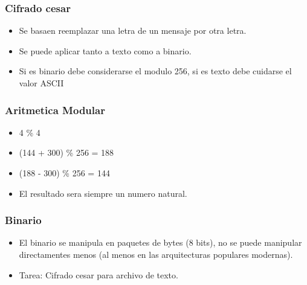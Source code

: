 \documentclass[11pt]{article}
\begin{document}
\subsubsection{Cifrado cesar}
\label{sec:org1281b5b}
\begin{itemize}
\item Se basaen reemplazar una letra de un mensaje por otra letra.
\item Se puede aplicar tanto a texto como a binario.
\item Si es binario debe considerarse el modulo 256, si es texto debe cuidarse el valor ASCII
\end{itemize}
\subsubsection{Aritmetica Modular}
\label{sec:org6bbca28}
\begin{itemize}
\item 4 \% 4
\item (144 + 300) \% 256 = 188
\item (188 - 300) \% 256 = 144
\item El resultado sera siempre un numero natural.
\end{itemize}
\subsubsection{Binario}
\label{sec:org7a69e42}
\begin{itemize}
\item El binario se manipula en paquetes de bytes (8 bits), no se puede manipular directamentes menos (al menos en las arquitecturas populares modernas).

\item Tarea: Cifrado cesar para archivo de texto.
\end{itemize}
\end{document}
